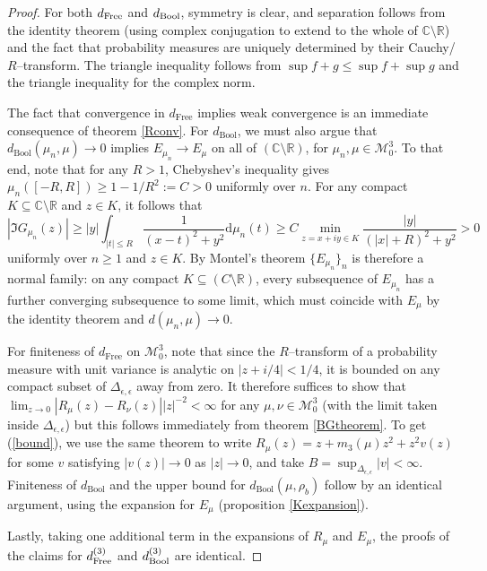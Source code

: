 \documentclass[10pt,a4paper]{amsart}
\begin{document}
\begin{proof} 
    For both $d_{\text{\normalfont Free}}$ and $d_{\text{\normalfont Bool}}$, symmetry is clear, and separation follows from the identity theorem (using complex conjugation to extend to the whole of $\mathbb{C}\setminus \mathbb{R}$) and the fact that probability measures are uniquely determined by their Cauchy/$R$--transform. The triangle inequality follows from $\sup f+g \leq \sup f + \sup g$ and the triangle inequality for the complex norm.

    The fact that convergence in $d_{\text{Free}}$ implies weak convergence is an immediate consequence of theorem \ref{Rconv}. For $d_{\text{Bool}}$, we must also argue that $d_{\text{Bool}}(\mu_n,\mu)\to 0$ implies $E_{\mu_n}\to E_\mu$ on all of $(\mathbb{C}\setminus \mathbb{R})$, for $\mu_n,\mu\in \mathcal{M}_0^3$. To that end, note that for any $R>1$, Chebyshev's inequality gives $\mu_n([-R,R])\geq 1-1/R^2:=C>0$ uniformly over $n$. For any compact $K\subseteq \mathbb{C}\setminus \mathbb{R}$ and $z\in K$, it follows that
    \[
        |\Im G_{\mu_n}(z)|\geq |y|\int_{|t|\leq R} \frac{1}{(x-t)^2+y^2}\mathrm{d}\mu_{n}(t)\geq C \min_{z=x+iy\in K} \frac{|y|}{(|x|+R)^2+y^2} >0
    \]
     uniformly over $n\geq 1$ and $z\in K$. By Montel's theorem $\{E_{\mu_n}\}_n$ is therefore a normal family: on any compact $K\subseteq (C\setminus \mathbb{R})$, every subsequence of $E_{\mu_n}$ has a further converging subsequence to some limit, which must coincide with $E_{\mu}$ by the identity theorem and $d(\mu_n,\mu)\to 0$.

    
    For finiteness of $d_{\text{Free}}$ on $\mathcal{M}_0^3$, note that since the $R$--transform of a probability measure with unit variance is analytic on $|z+i/4|<1/4$, it is bounded on any compact subset of $\Delta_{\epsilon,\epsilon}$ away from zero. It therefore suffices to show that $\lim_{z\to 0} {|R_\mu(z)-R_\nu(z)|}{|z|^{-2}}<\infty$
    for any $\mu,\nu\in\mathcal{M}_0^3$ (with the limit taken inside $\Delta_{\epsilon,\epsilon}$) but this follows immediately from theorem \ref{BGtheorem}. 
    To get (\ref{bound}), we use the same theorem to write $R_\mu(z)=z+m_3(\mu)z^2+z^2v(z)$ for some $v$ satisfying $|v(z)|\to 0$ as $|z|\to 0$, and take $B=\sup_{\Delta_{\epsilon,\epsilon}}|v|<\infty$. Finiteness of $d_{\text{Bool}}$ and the upper bound for $d_{\text{Bool}}(\mu,\rho_b)$ follow by an identical argument, using the expansion for $E_\mu$ (proposition \ref{Kexpansion}).
    
    Lastly, taking one additional term in the expansions of $R_\mu$ and $E_\mu$, the proofs of the claims for $d^{(3)}_{\text{\normalfont{Free}}}$ and $d^{(3)}_{\text{\normalfont{Bool}}}$ are identical.
\end{proof}
\end{document}
